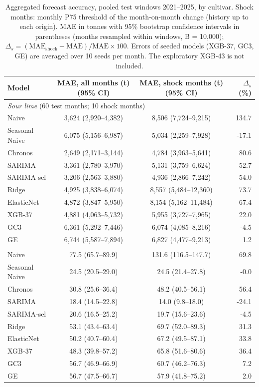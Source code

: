 \begin{table}[htbp]
\centering
\small
\caption{Aggregated forecast accuracy, pooled test windows 2021--2025, by cultivar. Shock months: monthly P75 threshold of the month-on-month change (history up to each origin). MAE in tonnes with 95\% bootstrap confidence intervals in parentheses (months resampled within windows, B = 10,000); $\Delta_s = (\mathrm{MAE}_{\mathrm{shock}} - \mathrm{MAE})/\mathrm{MAE} \times 100$. Errors of seeded models (XGB-37, GC3, GE) are averaged over 10 seeds per month. The exploratory XGB-43 is not included.}
\label{tab:main_aggregate_accuracy}
\begin{tabular}{lccr}
\toprule
Model & MAE, all months (t) (95\% CI) & MAE, shock months (t) (95\% CI) & $\Delta_s$ (\%) \\
\midrule
\multicolumn{4}{l}{\textit{Sour lime} (60 test months; 10 shock months)} \\
Naive & 3,624 (2,920--4,382) & 8,506 (7,724--9,215) & 134.7 \\
Seasonal Naive & 6,075 (5,156--6,987) & 5,034 (2,259--7,928) & -17.1 \\
Chronos & 2,649 (2,171--3,144) & 4,784 (3,963--5,641) & 80.6 \\
SARIMA & 3,361 (2,780--3,970) & 5,131 (3,759--6,624) & 52.7 \\
SARIMA-sel & 3,206 (2,563--3,880) & 4,936 (2,866--7,242) & 54.0 \\
Ridge & 4,925 (3,838--6,074) & 8,557 (5,484--12,360) & 73.7 \\
ElasticNet & 4,872 (3,847--5,950) & 8,154 (5,162--11,484) & 67.4 \\
XGB-37 & 4,881 (4,063--5,732) & 5,955 (3,727--7,965) & 22.0 \\
GC3 & 6,361 (5,292--7,446) & 6,074 (4,085--8,216) & -4.5 \\
GE & 6,744 (5,587--7,894) & 6,827 (4,477--9,213) & 1.2 \\
\addlinespace
\multicolumn{4}{l}{\textit{Sweet lime} (60 test months; 15 shock months)} \\
Naive & 77.5 (65.7--89.9) & 131.6 (116.5--147.7) & 69.8 \\
Seasonal Naive & 24.5 (20.5--29.0) & 24.5 (21.4--27.8) & -0.0 \\
Chronos & 30.8 (25.6--36.4) & 48.2 (40.5--56.1) & 56.4 \\
SARIMA & 18.4 (14.5--22.8) & 14.0 (9.8--18.0) & -24.1 \\
SARIMA-sel & 20.6 (16.5--25.2) & 19.7 (15.6--23.6) & -4.5 \\
Ridge & 53.1 (43.4--63.4) & 69.7 (52.0--89.3) & 31.3 \\
ElasticNet & 50.2 (40.7--60.4) & 67.2 (49.5--87.1) & 33.8 \\
XGB-37 & 48.3 (39.8--57.2) & 65.8 (51.6--80.6) & 36.4 \\
GC3 & 56.7 (46.9--66.9) & 60.7 (46.2--76.3) & 7.2 \\
GE & 56.7 (47.5--66.7) & 57.9 (41.8--75.2) & 2.0 \\
\bottomrule
\end{tabular}
\end{table}
